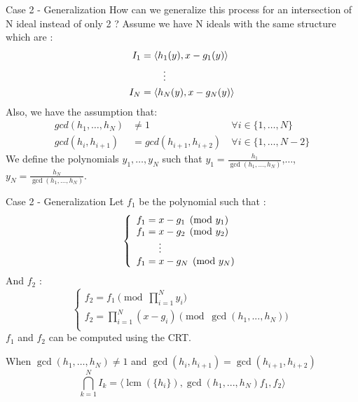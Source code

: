 \documentclass{beamer}
\DeclareMathOperator{\lcm}{lcm}
\begin{document}
\begin{frame}{Case 2 - Generalization}
How can we generalize this process for an intersection of N ideal instead of only 2 ?
Assume we have N ideals with the same structure which are :
\begin{align*}
    I_{1} & = \langle h_{1}(y),x-g_{1}(y) \rangle    \\
          & \hspace{8mm} \vdots                      \\
    I_{N} & = \langle h_{N}(y),x-g_{N}(y) \rangle
\end{align*}
Also, we have the assumption that: 
\begin{align*}
    gcd(h_{1},\dots,h_{N}) & \neq 1                 & \forall i \in \{1,\dots,N\} \\
    gcd(h_{i},h_{i+1})     & =gcd(h_{i+1},h_{i+2})\ & \forall i \in \{1,\dots,N-2\}
\end{align*}
 We define the polynomials $y_{1},\dots,y_{N}$ such that $y_{1} = \displaystyle \frac{h_{1}}{\gcd(h_{1},\dots,h_{N})}$,$\dots$, $y_{N} = \displaystyle \frac{h_{N}}{\gcd(h_{1},\dots,h_{N})}$.

\end{frame}

\begin{frame}{Case 2 - Generalization}
    Let $f_{1}$ be the polynomial such that :
\begin{displaymath}
    \left\{
    \begin{array}{ll}
        f_{1} = x-g_{1} \pmod {y_{1}} \\
        f_{1} = x-g_{2} \pmod {y_{2}} \\
        \hspace{8mm} \vdots \\
        f_{1} = x-g_{N} \pmod{y_{N}}\\
    \end{array}
    \right.
\end{displaymath}
    And $f_{2}$ :
\begin{displaymath}
    \left\{
    \begin{array}{ll}
        f_{2} = f_{1} \pmod {\prod_{i=1}^{N} y_{i}} \\
        f_{2} = \prod^{N}_{i=1} (x-g_{i}) \pmod {\gcd(h_{1},...,h_{N})} \\
    \end{array}
    \right.
\end{displaymath}
$f_1$ and $f_2$ can be computed using the CRT.

\begin{theorem}
    When $\gcd(h_{1},\dots,h_{N})\neq 1$ and $\gcd(h_{i},h_{i+1}) = \gcd(h_{i+1},h_{i+2}) $
    \begin{displaymath}
        \bigcap_{k = 1}^{N} I_{k} = \langle \lcm(\{h_{i}\}), \gcd(h_{1},...,h_{N})f_{1},f_{2} \rangle
    \end{displaymath}
\end{theorem}
\end{frame}
\end{document}

